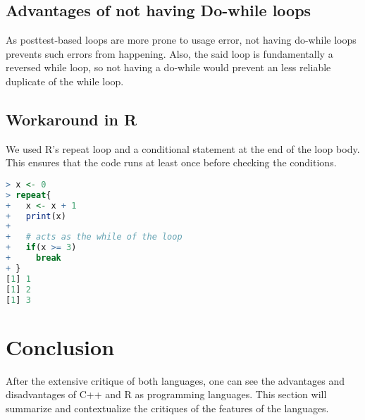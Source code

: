 \documentclass[12pt]{article}
\begin{document}
\subsection{Advantages of not having Do-while loops}
As posttest-based loops are more prone to usage error, not having do-while loops prevents such errors from happening. Also, the said loop is fundamentally a reversed while loop, so not having a do-while would prevent an less reliable duplicate of the while loop.

\subsection{Workaround in R}
We used R's repeat loop and a conditional statement at the end of the loop body. This ensures that the code runs at least once before checking the conditions.

\begin{lstlisting}[language=R ]
> x <- 0
> repeat{
+   x <- x + 1
+   print(x)
+
+   # acts as the while of the loop
+   if(x >= 3)
+     break
+ }
[1] 1
[1] 2
[1] 3
\end{lstlisting}

\section{Conclusion}
After the extensive critique of both languages, one can see the advantages and disadvantages of C++ and R as programming languages. This section will summarize and contextualize the critiques of the features of the languages.
\end{document}
